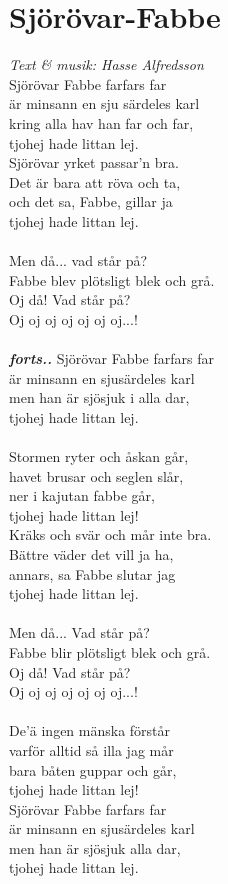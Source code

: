 \section{Sjörövar-Fabbe}
\textit{Text \& musik: Hasse Alfredsson}
\vspace{2mm}\\
Sjörövar Fabbe farfars far\\
är minsann en sju särdeles karl\\
kring alla hav han far och far,\\
tjohej hade littan lej.\\
Sjörövar yrket passar'n bra.\\
Det är bara att röva och ta,\\
och det sa, Fabbe, gillar ja\\
tjohej hade littan lej.\\
\\
Men då... vad står på?\\
Fabbe blev plötsligt blek och grå.\\
Oj då! Vad står på?\\
Oj oj oj oj oj oj oj...!\\
\\
\textbf{\textit{forts..}}
\newpage
\noindent Sjörövar Fabbe farfars far\\
är minsann en sjusärdeles karl\\
men han är sjösjuk i alla dar,\\
tjohej hade littan lej.\\
\\
Stormen ryter och åskan går,\\
havet brusar och seglen slår,\\
ner i kajutan fabbe går,\\
tjohej hade littan lej!\\
Kräks och svär och mår inte bra.\\
Bättre väder det vill ja ha,\\
annars, sa Fabbe slutar jag\\
tjohej hade littan lej.\\
\\
Men då... Vad står på?\\
Fabbe blir plötsligt blek och grå.\\
Oj då! Vad står på?\\
Oj oj oj oj oj oj oj...!\\
\\
De'ä ingen mänska förstår\\
varför alltid så illa jag mår\\
bara båten guppar och går,\\
tjohej hade littan lej!\\
Sjörövar Fabbe farfars far\\
är minsann en sjusärdeles karl\\
men han är sjösjuk alla dar,\\
tjohej hade littan lej.

